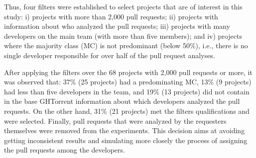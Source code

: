 \documentclass{sig-alternate}
\begin{document}
Thus, four filters were established to select projects that are of interest in this study: i) projects with more than 2,000 pull requests; ii) projects with information about who analyzed the pull requests; iii) projects with many developers on the main team (with more than five members); and iv) projects where the majority class (MC) is not predominant (below 50\%), i.e., there is no single developer responsible for over half of the pull request analyses. 

After applying the filters over the 68 projects with 2,000 pull requests or more, it was observed that: 37\% (25 projects) had a predominating MC, 13\% (9 projects) had less than five developers in the team, and 19\% (13 projects) did not contain in the base GHTorrent information about which developers analyzed the pull requests. On the other hand, 31\% (21 projects) met the filters qualifications and were selected. Finally, pull requests that were analyzed by the requesters themselves were removed from the experiments. This decision aims at avoiding getting inconsistent results and simulating more closely the process of assigning the pull requests among the developers. 
\end{document}
